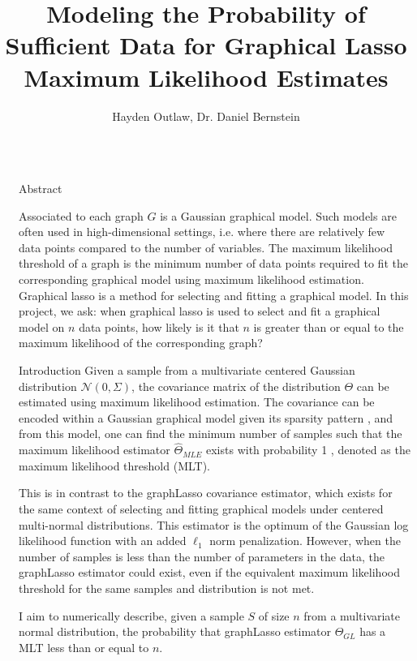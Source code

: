 \documentclass[final]{beamer}
\title{Modeling the Probability of Sufficient Data for Graphical Lasso Maximum Likelihood Estimates }
\author{Hayden Outlaw, Dr. Daniel Bernstein}
\institute[shortinst]{Tulane University}
\newlength{\sepwidth}
\newlength{\colwidth}
\newcommand{\separatorcolumn}{\begin{column}{\sepwidth}\end{column}}
\begin{document}
\begin{frame}[t]
\begin{columns}[t]
\separatorcolumn

\begin{column}{\colwidth}

    \begin{exampleblock}{Abstract}
    
    Associated to each graph $G$ is a Gaussian graphical model. Such models are often used in high-dimensional settings, i.e. where there are relatively few data points compared to the number of variables. The maximum likelihood threshold of a graph is the minimum number of data points required to fit the corresponding graphical model using maximum likelihood estimation. Graphical lasso is a method for selecting and fitting a graphical model. In this project, we ask: when graphical lasso is used to select and fit a graphical model on $n$ data points, how likely is it that $n$ is greater than or equal to the maximum likelihood of the corresponding graph? 

    \end{exampleblock}

  \begin{block}{Introduction}
Given a sample from a multivariate centered Gaussian distribution $\mathcal{N}(0, \Sigma)$, the covariance matrix of the distribution $\Theta$ can be estimated using maximum likelihood estimation. The covariance can be encoded within a Gaussian graphical model given its sparsity pattern \cite{dempster1981estimation}, and from this model, one can find the minimum number of samples such that the maximum likelihood estimator $\hat{\Theta}_{MLE}$ exists with probability 1 \cite{gross2018maximum}, denoted as the maximum likelihood threshold (MLT).

This is in contrast to the graphLasso covariance estimator, which exists for the same context of selecting and fitting graphical models under centered multi-normal distributions. This estimator is the optimum of the Gaussian log likelihood function with an added $\ell_{1}$ norm penalization. However, when the number of samples is less than the number of parameters in the data, the graphLasso estimator could exist, even if the equivalent maximum likelihood threshold for the same samples and distribution is not met.

I aim to numerically describe, given a sample $S$ of size $n$ from a multivariate normal distribution, the probability that graphLasso estimator $\hat{\Theta}_{GL}$ has a MLT less than or equal to $n$.
  \end{block}


\end{column}
\end{columns}
\end{frame}
\end{document}
